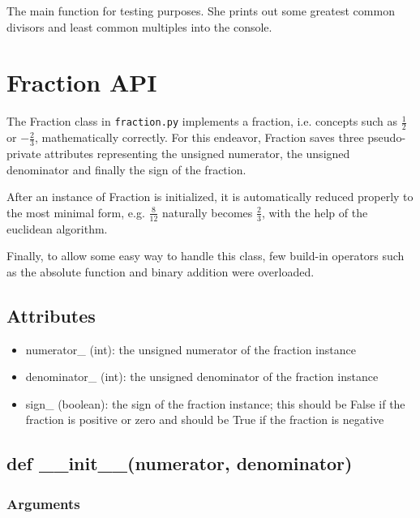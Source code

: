 \documentclass[refman]{scrartcl}
\begin{document}
The main function for testing purposes. She prints out some greatest common divisors and least common multiples into the console.


\section{Fraction API}

The Fraction class in \texttt{fraction.py} implements a fraction, i.e. concepts such as \(\frac{1}{2}\) or \(-\frac{2}{3}\), mathematically correctly. For this endeavor, Fraction saves three pseudo-private attributes representing the unsigned numerator, the unsigned denominator and finally the sign of the fraction.

After an instance of Fraction is initialized, it is automatically reduced properly to the most minimal form, e.g. \(\frac{8}{12}\) naturally becomes \(\frac{2}{3}\), with the help of the euclidean algorithm.

Finally, to allow some easy way to handle this class, few build-in operators such as the absolute function and binary addition were overloaded.

\subsection{Attributes}

\begin{itemize}
	\item numerator\_ (int): the unsigned numerator of the fraction instance
	\item denominator\_ (int): the unsigned denominator of the fraction instance
	\item sign\_ (boolean): the sign of the fraction instance; this should be False if the fraction is positive or zero and should be True if the fraction is negative
\end{itemize}

\subsection{def \_\_init\_\_(numerator, denominator)}

\subsubsection*{Arguments}
\end{document}
